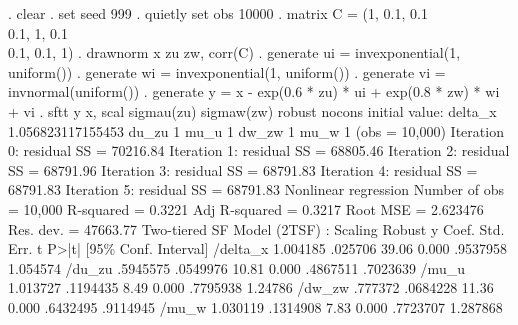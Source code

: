 . clear
{\smallskip}
. set seed 999
{\smallskip}
. quietly set obs 10000
{\smallskip}
. matrix C = (1, 0.1, 0.1 \\ 0.1, 1, 0.1 \\ 0.1, 0.1, 1)
{\smallskip}
. drawnorm x zu zw, corr(C)
{\smallskip}
. generate ui = invexponential(1, uniform())
{\smallskip}
. generate wi = invexponential(1, uniform())
{\smallskip}
. generate vi = invnormal(uniform())
{\smallskip}
. generate y = x - exp(0.6 * zu) * ui + exp(0.8 * zw) * wi + vi
{\smallskip}
. sftt y x, scal sigmau(zu) sigmaw(zw) robust nocons
initial value: delta_x 1.056823117155453 du_zu 1 mu_u 1 dw_zw 1 mu_w 1
(obs = 10,000)
{\smallskip}
Iteration 0:  residual SS =  70216.84
Iteration 1:  residual SS =  68805.46
Iteration 2:  residual SS =  68791.96
Iteration 3:  residual SS =  68791.83
Iteration 4:  residual SS =  68791.83
Iteration 5:  residual SS =  68791.83
{\smallskip}
{\smallskip}
Nonlinear regression                                Number of obs =     10,000
                                                    R-squared     =     0.3221
                                                    Adj R-squared =     0.3217
                                                    Root MSE      =   2.623476
                                                    Res. dev.     =   47663.77
{\smallskip}
Two-tiered SF Model (2TSF) : Scaling
             {\VBAR}               Robust
           y {\VBAR}      Coef.   Std. Err.      t    P>|t|     [95\% Conf. Interval]
    /delta_x {\VBAR}   1.004185    .025706    39.06   0.000     .9537958    1.054574
      /du_zu {\VBAR}   .5945575   .0549976    10.81   0.000     .4867511    .7023639
       /mu_u {\VBAR}   1.013727   .1194435     8.49   0.000     .7795938     1.24786
      /dw_zw {\VBAR}    .777372   .0684228    11.36   0.000     .6432495    .9114945
       /mu_w {\VBAR}   1.030119   .1314908     7.83   0.000     .7723707    1.287868
